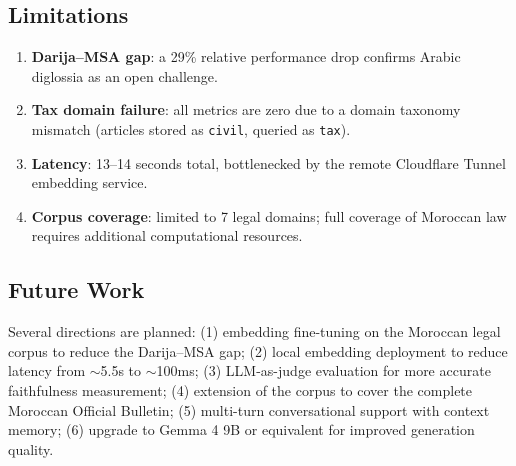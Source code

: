 \subsection{Limitations}

\begin{enumerate}
    \item \textbf{Darija--MSA gap}: a 29\% relative performance drop confirms
    Arabic diglossia as an open challenge.
    \item \textbf{Tax domain failure}: all metrics are zero due to a domain
    taxonomy mismatch (articles stored as \texttt{civil}, queried as
    \texttt{tax}).
    \item \textbf{Latency}: 13--14 seconds total, bottlenecked by the remote
    Cloudflare Tunnel embedding service.
    \item \textbf{Corpus coverage}: limited to 7 legal domains; full coverage
    of Moroccan law requires additional computational resources.
\end{enumerate}

\subsection{Future Work}

Several directions are planned: (1) embedding fine-tuning on the Moroccan
legal corpus to reduce the Darija--MSA gap; (2) local embedding deployment
to reduce latency from $\sim$5.5s to $\sim$100ms; (3) LLM-as-judge
evaluation for more accurate faithfulness measurement; (4) extension of the
corpus to cover the complete Moroccan Official Bulletin; (5) multi-turn
conversational support with context memory; (6) upgrade to Gemma 4 9B or
equivalent for improved generation quality.
